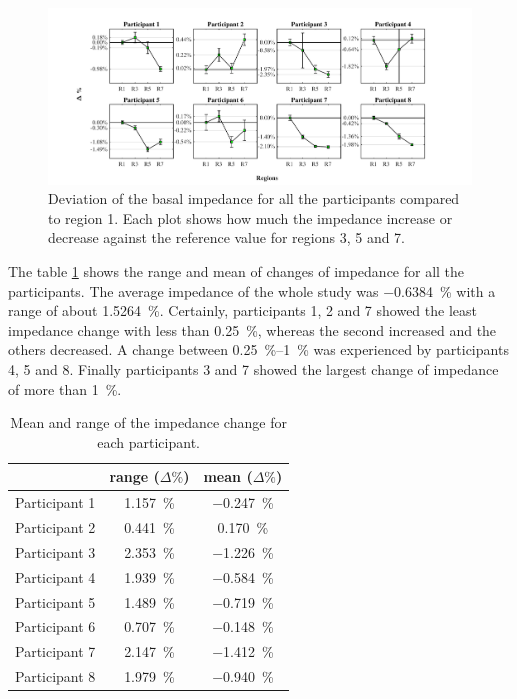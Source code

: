 \begin{figure}[!t]  %
	\includegraphics[width=\textwidth,keepaspectratio, trim={2cm 0cm 3cm 0cm},clip]{figure_b_4}    
	\caption[Percentil change of baseline imepdance]{Deviation of the basal impedance for all the participants compared to region 1. Each plot shows how much the impedance increase or decrease against the reference value for regions 3, 5 and 7. }
	\label{fig:delta percent} 
\end{figure}

The table \ref{tbl:change imepdance} shows the range and mean of changes of impedance for all the participants. The average impedance of the whole study was \SI{-0.6384}{\percent} with a range of about \SI{1.5264}{\percent}. Certainly, participants 1, 2 and 7 showed the least impedance change with less than \SI{0.25}{\percent}, whereas the second increased and the others decreased.  A change between \SIrange{0.25}{1}{\percent} was experienced by participants 4, 5 and 8. Finally participants 3 and 7 showed the largest change of impedance of more than \SI{1}{\percent}. 

\begin{table}[!htbp]
	\caption[Range and mean change of impedance of each participant]{Mean and range of the impedance change for each participant.}
	\label{tbl:change imepdance}
	\centering \small
	\begin{tabular}{lcc}
		\toprule
		&\textbf{range ($\Delta \%$)}
		&\textbf{mean ($\Delta \%$)} \\ \midrule
		Participant 1    &     \SI{1.157}{\percent}    &     \SI{-0.247}{\percent}    \\  
		Participant 2    &     \SI{0.441}{\percent}    &     \SI{0.170}{\percent}    \\  
		Participant 3    &     \SI{2.353}{\percent}    &     \SI{-1.226}{\percent}    \\  
		Participant 4    &     \SI{1.939}{\percent}    &     \SI{-0.584}{\percent}    \\  
		Participant 5    &     \SI{1.489}{\percent}    &     \SI{-0.719}{\percent}    \\  
		Participant 6    &     \SI{0.707}{\percent}    &     \SI{-0.148}{\percent}    \\  
		Participant 7    &     \SI{2.147}{\percent}    &     \SI{-1.412}{\percent}    \\  
		Participant 8    &     \SI{1.979}{\percent}    &     \SI{-0.940}{\percent}    \\ 
		\bottomrule 
	\end{tabular}
\end{table}

